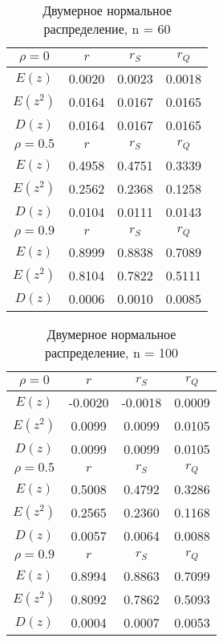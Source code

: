 	\begin{table}[H]
		\centering
		\begin{tabular}{| c | c | c | c |}

		\hline
		 ${\rho} = 0$   & $r$    & $r_{S}$ & $r_{Q}$ \\
		\hline
		 $E(z)$         & 0.0020 & 0.0023  & 0.0018  \\
		 $E(z^{2})$     & 0.0164 & 0.0167  & 0.0165  \\
		 $D(z)$         & 0.0164 & 0.0167  & 0.0165  \\
		\hline
		 ${\rho} = 0.5$ & $r$    & $r_{S}$ & $r_{Q}$ \\
		\hline
		 $E(z)$         & 0.4958 & 0.4751  & 0.3339  \\
		 $E(z^{2})$     & 0.2562 & 0.2368  & 0.1258  \\
		 $D(z)$         & 0.0104 & 0.0111  & 0.0143  \\
		\hline
		 ${\rho} = 0.9$ & $r$    & $r_{S}$ & $r_{Q}$ \\
		\hline
		 $E(z)$         & 0.8999 & 0.8838  & 0.7089  \\
		 $E(z^{2})$     & 0.8104 & 0.7822  & 0.5111  \\
		 $D(z)$         & 0.0006 & 0.0010  & 0.0085  \\
		\hline

		\end{tabular}{}
		\caption{Двумерное нормальное распределение, n = 60}
		\label{tab:n60}
	\end{table}



	\begin{table}[H]
		\centering
		\begin{tabular}{| c | c | c | c |}

		\hline
		 ${\rho} = 0$   & $r$     & $r_{S}$ & $r_{Q}$ \\
		\hline
		 $E(z)$         & -0.0020 & -0.0018 & 0.0009  \\
		 $E(z^{2})$     & 0.0099  & 0.0099  & 0.0105  \\
		 $D(z)$         & 0.0099  & 0.0099  & 0.0105  \\
		\hline
		 ${\rho} = 0.5$ & $r$     & $r_{S}$ & $r_{Q}$ \\
		\hline
		 $E(z)$         & 0.5008  & 0.4792  & 0.3286  \\
		 $E(z^{2})$     & 0.2565  & 0.2360  & 0.1168  \\
		 $D(z)$         & 0.0057  & 0.0064  & 0.0088  \\
		\hline
		 ${\rho} = 0.9$ & $r$     & $r_{S}$ & $r_{Q}$ \\
		\hline
		 $E(z)$         & 0.8994  & 0.8863  & 0.7099  \\
		 $E(z^{2})$     & 0.8092  & 0.7862  & 0.5093  \\
		 $D(z)$         & 0.0004  & 0.0007  & 0.0053  \\
		\hline

		\end{tabular}{}
		\caption{Двумерное нормальное распределение, n = 100}
		\label{tab:n100}
	\end{table}


